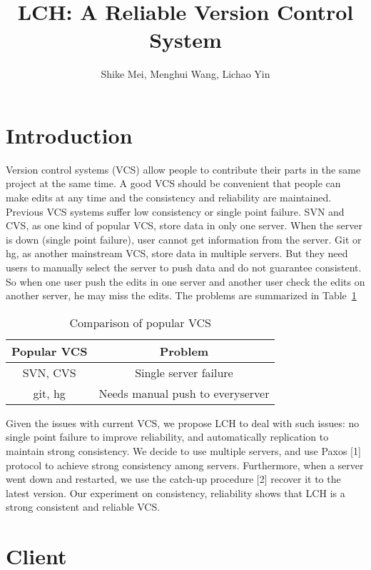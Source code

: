 \documentclass[11pt]{article}
\title{LCH: A Reliable Version Control System}
\author{Shike Mei, Menghui Wang, Lichao Yin}
\begin{document}
\maketitle
\section{Introduction}

Version control systems (VCS) allow people to contribute their parts in the same project at the same time. A good VCS should be convenient that people can make edits at any time and the consistency and reliability are maintained. Previous VCS systems suffer low consistency or single point failure. SVN and CVS, as one kind of popular VCS, store data in only one server. When the server is down (single point failure), user cannot get information from the server. Git or hg, as another mainstream VCS, store data in multiple servers. But they need users to manually select the server to push data and do not guarantee consistent. So when one user push the edits in one server and another user check the edits on another server, he may miss the edits. The problems are summarized in Table~\ref{table:problems}

\begin{table}
    \centering
\begin{tabular}{|c|c|}
  \hline
  Popular VCS & Problem  \\ \hline
  SVN, CVS & Single server failure \\
  git, hg & Needs manual push to everyserver \\
  \hline
\end{tabular}
\caption{Comparison of popular VCS}
\label{table:problems}
\end{table}

Given the issues with current VCS, we propose LCH to deal with such issues: no single point failure to improve reliability, and automatically replication to maintain strong consistency. We decide to use multiple servers, and use Paxos [1] protocol to achieve strong consistency among servers. Furthermore, when a server went down and restarted, we use the catch-up procedure [2] recover it to the latest version. Our experiment on consistency, reliability shows that LCH is a strong consistent and reliable VCS.

\section{Client}
\end{document}
